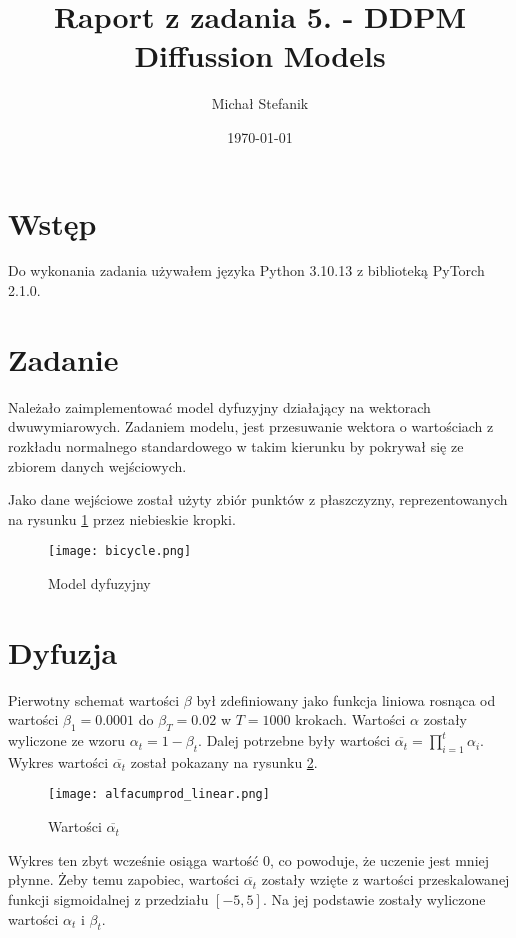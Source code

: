 \documentclass[a4paper]{article}
\author{Michał Stefanik}
\date{\today}
\title{Raport z zadania 5. - DDPM Diffussion Models}
\begin{document}
\maketitle
\section{Wstęp}
Do wykonania zadania używałem języka Python 3.10.13
z biblioteką PyTorch 2.1.0.

\section{Zadanie}

Należało zaimplementować model dyfuzyjny działający na wektorach dwuwymiarowych.
Zadaniem modelu, jest przesuwanie wektora o wartościach z rozkładu normalnego standardowego
w takim kierunku by pokrywał się ze zbiorem danych wejściowych.

Jako dane wejściowe został użyty zbiór punktów z płaszczyzny, reprezentowanych na
rysunku \ref{fig:rower} przez niebieskie kropki.

\begin{figure}[H]
    \centering
    \texttt{[image: bicycle.png]}
    \caption{Model dyfuzyjny}
    \label{fig:rower}
\end{figure}

\section{Dyfuzja}

Pierwotny schemat wartości $\beta$ był zdefiniowany jako funkcja liniowa
rosnąca od wartości $\beta_1 = 0.0001 $
do $\beta_T = 0.02$ w $ T = 1000 $ krokach. Wartości $\alpha$ zostały wyliczone
ze wzoru $\alpha_t = 1 - \beta_t $. Dalej potrzebne były wartości
$ \overline{\alpha_t} = \prod_{i=1}^{t} \alpha_i $. Wykres wartości
$\overline{\alpha_t}$ został pokazany na rysunku \ref{fig:alphacumprod_linear}.

\begin{figure}[H]
    \centering
    \texttt{[image: alfacumprod\_linear.png]}
    \caption{Wartości $\overline{\alpha_t}$}
    \label{fig:alphacumprod_linear}
\end{figure}

Wykres ten zbyt wcześnie osiąga wartość 0, co powoduje, że uczenie jest mniej płynne.
Żeby temu zapobiec, wartości $\overline{\alpha_t}$ zostały wzięte z wartości przeskalowanej
funkcji sigmoidalnej z przedziału $[-5, 5]$. Na jej podstawie zostały wyliczone wartości
$\alpha_t$ i $\beta_t$.
\end{document}
